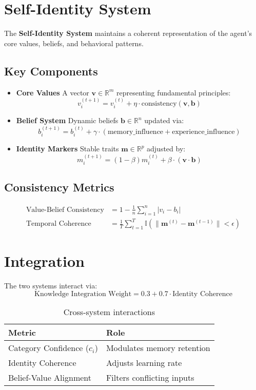 \documentclass{article}
\begin{document}
\section{Self-Identity System}
The \textbf{Self-Identity System} maintains a coherent representation of the agent's core values, beliefs, and behavioral patterns.

\subsection{Key Components}
\begin{itemize}
    \item \textbf{Core Values}  
    A vector $\mathbf{v} \in \mathbb{R}^m$ representing fundamental principles:
    \[
    v_i^{(t+1)} = v_i^{(t)} + \eta \cdot \text{consistency}(\mathbf{v}, \mathbf{b})
    \]

    \item \textbf{Belief System}  
    Dynamic beliefs $\mathbf{b} \in \mathbb{R}^n$ updated via:
    \[
    b_i^{(t+1)} = b_i^{(t)} + \gamma \cdot \left( \text{memory\_influence} + \text{experience\_influence} \right)
    \]

    \item \textbf{Identity Markers}  
    Stable traits $\mathbf{m} \in \mathbb{R}^p$ adjusted by:
    \[
    m_i^{(t+1)} = (1-\beta) m_i^{(t)} + \beta \cdot \left( \mathbf{v} \cdot \mathbf{b} \right)
    \]
\end{itemize}

\subsection{Consistency Metrics}
\begin{align*}
    \text{Value-Belief Consistency} &= 1 - \frac{1}{n} \sum_{i=1}^n |v_i - b_i| \\
    \text{Temporal Coherence} &= \frac{1}{T} \sum_{t=1}^T \mathbb{I}(\|\mathbf{m}^{(t)} - \mathbf{m}^{(t-1)}\| < \epsilon)
\end{align*}

\section{Integration}
The two systems interact via:
\[
\text{Knowledge Integration Weight} = 0.3 + 0.7 \cdot \text{Identity Coherence}
\]

\begin{table}[h]
\centering
\begin{tabular}{ll}
\toprule
\textbf{Metric} & \textbf{Role} \\
\midrule
Category Confidence ($c_i$) & Modulates memory retention \\
Identity Coherence & Adjusts learning rate \\
Belief-Value Alignment & Filters conflicting inputs \\
\bottomrule
\end{tabular}
\caption{Cross-system interactions}
\end{table}
\end{document}
